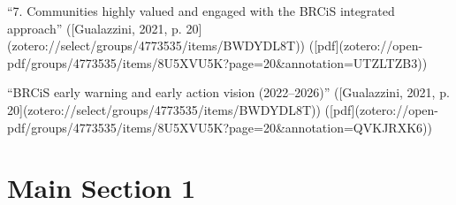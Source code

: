 “7. Communities highly valued and engaged with the BRCiS integrated approach” ([Gualazzini, 2021, p. 20](zotero://select/groups/4773535/items/BWDYDL8T)) ([pdf](zotero://open-pdf/groups/4773535/items/8U5XVU5K?page=20&annotation=UTZLTZB3))

“BRCiS early warning and early action vision (2022–2026)” ([Gualazzini, 2021, p. 20](zotero://select/groups/4773535/items/BWDYDL8T)) ([pdf](zotero://open-pdf/groups/4773535/items/8U5XVU5K?page=20&annotation=QVKJRXK6))



\section{Main Section 1}